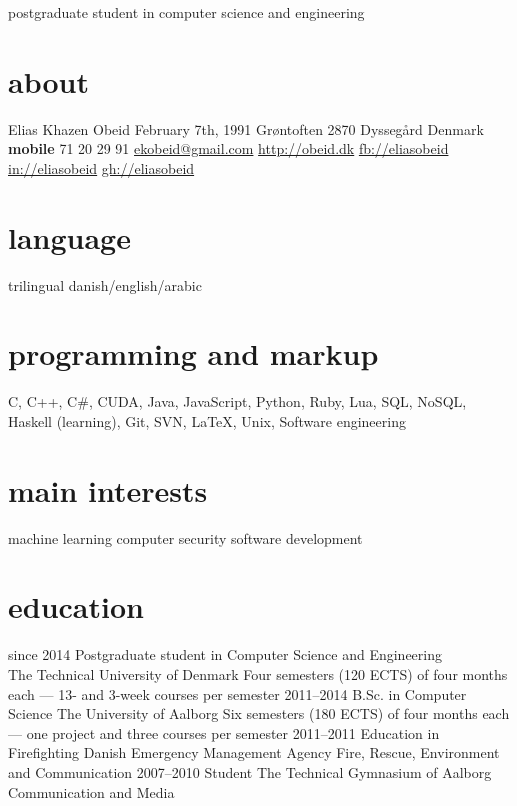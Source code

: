 \documentclass[]{friggeri-cv}
\begin{document}
    {postgraduate student in computer science and engineering}

\begin{aside}
  \section{about}
    Elias Khazen Obeid
    February 7th, 1991
    Grøntoften 
    2870 Dyssegård
    Denmark
    ~
    \textbf{mobile} 71 20 29 91
    \href{mailto:ekobeid@gmail.com}{ekobeid@gmail.com}
    \href{http://obeid.dk}{http://obeid.dk}
    \href{https://www.facebook.com/eliaskhazenobeid}{fb://eliasobeid}
    \href{https://www.linkedin.com/in/eliasobeid}{in://eliasobeid}
    \href{https://github.com/Obeyed}{gh://eliasobeid}
  \section{language}
    trilingual danish/english/arabic
  \section{programming and markup}
    C, C++, C\#, CUDA, Java, JavaScript, Python, Ruby, Lua, 
    SQL, NoSQL, 
    Haskell (learning),
    Git, SVN, \LaTeX{}, Unix,
    Software engineering
  \section{main interests}
    machine learning
    computer security
    software development
\end{aside}

\section{education}

\begin{entrylist}
  \entry
    {since 2014}
    {Postgraduate student {\normalfont in Computer Science and Engineering}\\}
    {The Technical University of Denmark}
    {Four semesters (120 ECTS) of four months each --- 13- and 3-week courses per semester}
  \entry
    {2011–2014}
    {B.Sc. {\normalfont in Computer Science}}
    {The University of Aalborg}
    {Six semesters (180 ECTS) of four months each --- one project and three courses per semester}
  \entry
    {2011–2011}
    {Education in Firefighting}
    {Danish Emergency Management Agency}
    {Fire, Rescue, Environment and Communication}
  \entry
    {2007–2010}
    {Student}
    {The Technical Gymnasium of Aalborg}
    {Communication and Media}
\end{entrylist}
\end{document}
